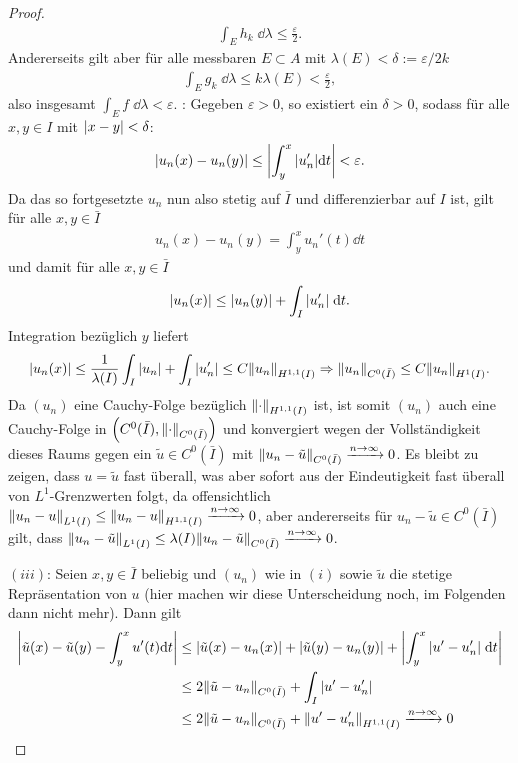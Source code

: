 \documentclass[twoside]{article}
\theoremstyle{definition}
\newcommand{\lk}{\left(}
\newcommand{\rk}{\right)}
\begin{document}
\begin{proof}
{\begin{align*}
\int_E h_k \; \dd \lambda \leq \frac{\varepsilon}{2}.
\end{align*}
Andererseits gilt aber für alle messbaren $E \subset A$ mit $\lambda(E) < \delta := \varepsilon / 2k$
\begin{align*}
\int_E g_k \; \dd \lambda \leq k \lambda(E) < \frac{\varepsilon}{2},
\end{align*}
also insgesamt $\int_E f \; \dd \lambda < \varepsilon$.
}: Gegeben $\varepsilon > 0$, so existiert ein $\delta > 0$, sodass für alle $x,y \in I$ mit $\abs{x-y} < \delta$:
\begin{align*}
\abs{u_n(x) - u_n(y)} \leq \abs{ \int_{y}^x \abs{u_n'} \dd t} < \varepsilon.
\end{align*}
Da das so fortgesetzte $u_n$ nun also stetig auf $\bar{I}$ und differenzierbar auf $I$ ist, gilt für alle $x,y \in \bar{I}$
\begin{align*}
u_n(x) - u_n(y) = \int_y^x u_n'(t) \dd t
\end{align*}
und damit für alle $x,y \in \bar{I}$
\begin{align*}
\abs{u_n(x)} \leq \abs{u_n(y)} + \int_I \abs{u_n'} \; \dd t.
\end{align*}
Integration bezüglich $y$ liefert
\begin{align*}
\abs{u_n(x)} \leq \frac{1}{\lambda(I)} \int_I \abs{u_n} +  \int_I  \abs{u_n'} \leq C \norm{u_n}_{H^{1,1}(I)} \Rightarrow \norm{u_n}_{C^0(\bar{I})} \leq C \norm{u_n}_{H^1(I)}.
\end{align*}
Da $(u_n)$ eine Cauchy-Folge bezüglich $\norm{\cdot}_{H^{1,1}(I)}$ ist, ist somit $(u_n)$ auch eine Cauchy-Folge in $\lk C^0(\bar{I}), \norm{\cdot}_{C^0(\bar{I})}\rk$ und konvergiert wegen der Vollständigkeit dieses Raums gegen ein $\tilde{u} \in C^0(\bar{I})$ mit $\norm{u_n - \tilde{u}}_{C^0(\bar{I})} \xrightarrow{n \to \infty} 0$. Es bleibt zu zeigen, dass $u = \tilde{u}$ fast überall, was aber sofort aus der Eindeutigkeit fast überall von $L^1$-Grenzwerten folgt, da offensichtlich $\norm{u_n - u}_{L^1(I)} \leq \norm{u_n - u}_{H^{1,1}(I)} \xrightarrow{n \to \infty} 0$, aber andererseits für $u_n -\tilde{ u} \in C^0(\bar{I})$ gilt, dass $\norm{u_n - \tilde{u}}_{L^1(I)} \leq \lambda(I) \norm{u_n - \tilde{u}}_{C^0(\bar{I})} \xrightarrow{n \to \infty} 0$.

$(iii)$: Seien $x,y \in \bar{I}$ beliebig und $(u_n)$ wie in $(i)$ sowie $\tilde{u}$ die stetige Repräsentation von $u$ (hier machen wir diese Unterscheidung noch, im Folgenden dann nicht mehr). Dann gilt
\begin{align*}
\abs{\tilde{u}(x)-\tilde{u}(y) - \int_y^x u'(t) \dd t} &\leq \abs{\tilde{u}(x)-u_n(x)} + \abs{\tilde{u}(y)-u_n(y)} + \abs{\int_y^x \abs{u' - u_n'} \; \dd t}\\
&\leq 2 \norm{\tilde{u}-u_n}_{C^0(\bar{I})} + \int_I \abs{u'-u_n'}\\
&\leq 2 \norm{\tilde{u}-u_n}_{C^0(\bar{I})} + \norm{u'-u_n'}_{H^{1,1}(I)} \xrightarrow{n \to \infty} 0
\end{align*}


\end{proof}
\end{document}
